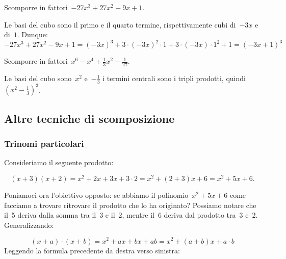 \begin{esempio}
Scomporre in fattori~$-27x^{3}+27x^{2}-9x+1$.

Le basi del cubo sono il primo e il quarto termine, rispettivamente cubi 
di~$-3x$ e di~$1$.
Dunque:
\[-27x^{3}+27x^{2}-9x+1=
  (-3x)^{3}+3\cdot (-3x)^{2}\cdot 1+3\cdot (-3x)\cdot 1^{2}+1=(-3x+1)^{3}\]
 \end{esempio}

 \begin{esempio}
Scomporre in fattori~$x^{6}-x^{4}+\frac{1}{3}x^{2}-\frac{1}{27}$.

Le basi del cubo sono~$x^{2}$ e~$-\frac{1}{3}$ i termini centrali sono i 
tripli prodotti, quindi~$\left(x^{2}-\frac{1}{3}\right)^{3}$.
\end{esempio}





\subsection{Altre tecniche di scomposizione}
\label{subsec:divpol_altretecniche}

\subsubsection{Trinomi particolari}
\label{subsubsec:trinpart}

Consideriamo il seguente prodotto:

\[(x+3)(x+2)=x^{2}+2x+3x+3 \cdot 2=x^{2}+(2+3)x+6=x^{2}+5x+6.\]

Poniamoci ora l'obiettivo opposto: se abbiamo il
polinomio~$x^{2}+5x+6$ come facciamo a trovare ritrovare il prodotto
che lo ha originato? Possiamo notare che il~5 deriva dalla somma tra
il~3 e il~2, mentre il~6 deriva dal prodotto tra~3 e~2. Generalizzando:

\[\left(x+a\right)\cdot \left(x+b\right)=
  x^{{2}}+ax+bx+ab=x^{2}+\left(a+b\right)x+a\cdot b\]
Leggendo la formula precedente da destra verso sinistra:

